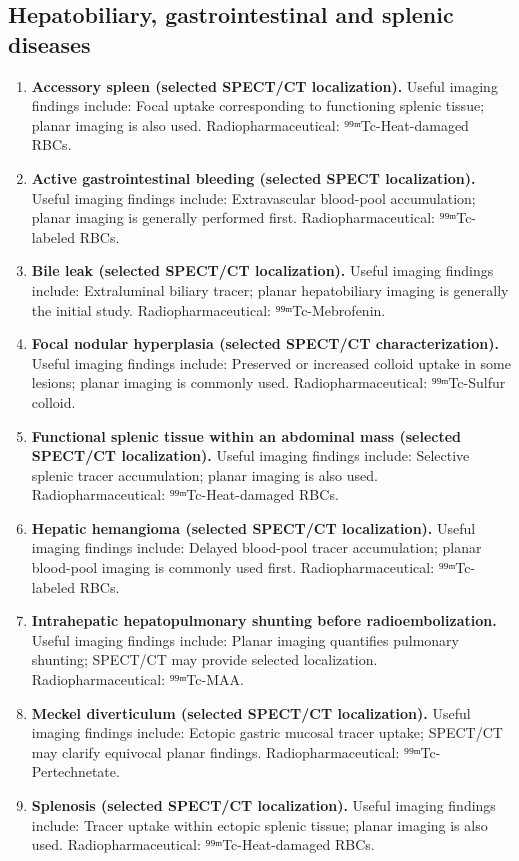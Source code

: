 \subsection{Hepatobiliary, gastrointestinal and splenic diseases}
\begin{enumerate}[leftmargin=*,itemsep=0.45em,topsep=0.4em]
\item \textbf{Accessory spleen (selected SPECT/CT localization).} Useful imaging findings include: Focal uptake corresponding to functioning splenic tissue; planar imaging is also used. Radiopharmaceutical: ⁹⁹ᵐTc-Heat-damaged RBCs.
\item \textbf{Active gastrointestinal bleeding (selected SPECT localization).} Useful imaging findings include: Extravascular blood-pool accumulation; planar imaging is generally performed first. Radiopharmaceutical: ⁹⁹ᵐTc-labeled RBCs.
\item \textbf{Bile leak (selected SPECT/CT localization).} Useful imaging findings include: Extraluminal biliary tracer; planar hepatobiliary imaging is generally the initial study. Radiopharmaceutical: ⁹⁹ᵐTc-Mebrofenin.
\item \textbf{Focal nodular hyperplasia (selected SPECT/CT characterization).} Useful imaging findings include: Preserved or increased colloid uptake in some lesions; planar imaging is commonly used. Radiopharmaceutical: ⁹⁹ᵐTc-Sulfur colloid.
\item \textbf{Functional splenic tissue within an abdominal mass (selected SPECT/CT localization).} Useful imaging findings include: Selective splenic tracer accumulation; planar imaging is also used. Radiopharmaceutical: ⁹⁹ᵐTc-Heat-damaged RBCs.
\item \textbf{Hepatic hemangioma (selected SPECT/CT localization).} Useful imaging findings include: Delayed blood-pool tracer accumulation; planar blood-pool imaging is commonly used first. Radiopharmaceutical: ⁹⁹ᵐTc-labeled RBCs.
\item \textbf{Intrahepatic hepatopulmonary shunting before radioembolization.} Useful imaging findings include: Planar imaging quantifies pulmonary shunting; SPECT/CT may provide selected localization. Radiopharmaceutical: ⁹⁹ᵐTc-MAA.
\item \textbf{Meckel diverticulum (selected SPECT/CT localization).} Useful imaging findings include: Ectopic gastric mucosal tracer uptake; SPECT/CT may clarify equivocal planar findings. Radiopharmaceutical: ⁹⁹ᵐTc-Pertechnetate.
\item \textbf{Splenosis (selected SPECT/CT localization).} Useful imaging findings include: Tracer uptake within ectopic splenic tissue; planar imaging is also used. Radiopharmaceutical: ⁹⁹ᵐTc-Heat-damaged RBCs.
\end{enumerate}

